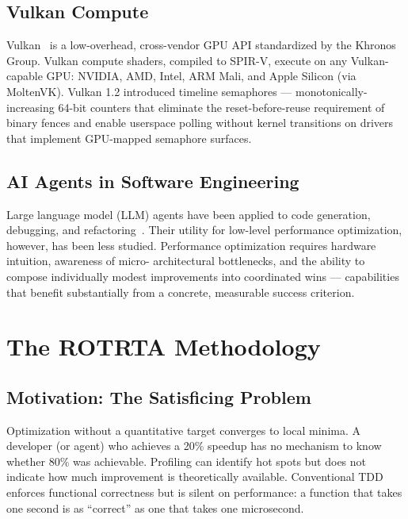 \documentclass[conference]{IEEEtran}
\begin{document}
\subsection{Vulkan Compute}

Vulkan~\cite{vulkan2024spec} is a low-overhead, cross-vendor GPU API
standardized by the Khronos Group.  Vulkan compute shaders, compiled to
SPIR-V, execute on any Vulkan-capable GPU: NVIDIA, AMD, Intel, ARM Mali,
and Apple Silicon (via MoltenVK).  Vulkan 1.2 introduced timeline
semaphores --- monotonically-increasing 64-bit counters that eliminate the
reset-before-reuse requirement of binary fences and enable userspace polling
without kernel transitions on drivers that implement GPU-mapped semaphore
surfaces.

\subsection{AI Agents in Software Engineering}

Large language model (LLM) agents have been applied to code generation,
debugging, and refactoring~\cite{chen2021evaluating}.  Their utility for
low-level performance optimization, however, has been less studied.
Performance optimization requires hardware intuition, awareness of micro-
architectural bottlenecks, and the ability to compose individually modest
improvements into coordinated wins --- capabilities that benefit substantially
from a concrete, measurable success criterion.

\section{The ROTRTA Methodology}
\label{sec:rotrta}

\subsection{Motivation: The Satisficing Problem}

Optimization without a quantitative target converges to local minima.  A
developer (or agent) who achieves a 20\% speedup has no mechanism to know
whether 80\% was achievable.  Profiling can identify hot spots but does not
indicate how much improvement is theoretically available.  Conventional TDD
enforces functional correctness but is silent on performance: a function that
takes one second is as ``correct'' as one that takes one microsecond.
\end{document}
